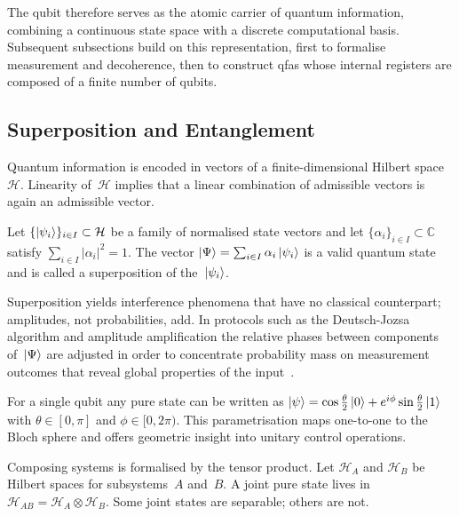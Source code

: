  The qubit therefore serves as the atomic carrier of quantum information,
 combining a continuous state space with a discrete computational basis.
 Subsequent subsections build on this representation, first to formalise
 measurement and decoherence, then to construct \glspl{qfa}
 whose internal registers are composed of a finite number of qubits.

 \subsection{Superposition and Entanglement}\label{subsec:superposition_entanglement}

 Quantum information is encoded in vectors of a finite-dimensional Hilbert space~$\mathcal H$.  
 Linearity of~$\mathcal H$ implies that a linear combination of admissible vectors is again an admissible vector.  
 
 \begin{definition}
   Let $\{\ket{\psi_i}\}_{i\in I}\subset\mathcal H$ be a family of normalised state vectors and let $\{\alpha_i\}_{i\in I}\subset\mathbb C$ satisfy $\sum_{i\in I}\lvert\alpha_i\rvert^2=1$.  
   The vector $\ket{\Psi}=\sum_{i\in I}\alpha_i\ket{\psi_i}$ is a valid quantum state and is called a superposition of the~$\ket{\psi_i}$.
 \end{definition}
 
 Superposition yields interference phenomena that have no classical counterpart; amplitudes, not probabilities, add.  
 In protocols such as the Deutsch-Jozsa algorithm and amplitude amplification the relative phases between components of~$\ket{\Psi}$ are adjusted in order to concentrate probability mass on measurement outcomes that reveal global properties of the input~\cite{nielsen2010quantum}.  
 
 \begin{remark}
   For a single qubit any pure state can be written as $\ket{\psi}=\cos\frac\theta2\ket{0}+e^{i\phi}\sin\frac\theta2\ket{1}$ with $\theta\in[0,\pi]$ and $\phi\in[0,2\pi)$.  
   This parametrisation maps one-to-one to the Bloch sphere and offers geometric insight into unitary control operations.
 \end{remark}
 
 
 Composing systems is formalised by the tensor product.  
 Let $\mathcal H_A$ and $\mathcal H_B$ be Hilbert spaces for subsystems~$A$ and~$B$.  
 A joint pure state lives in $\mathcal H_{AB}=\mathcal H_A\otimes\mathcal H_B$.  
 Some joint states are separable; others are not.
 
